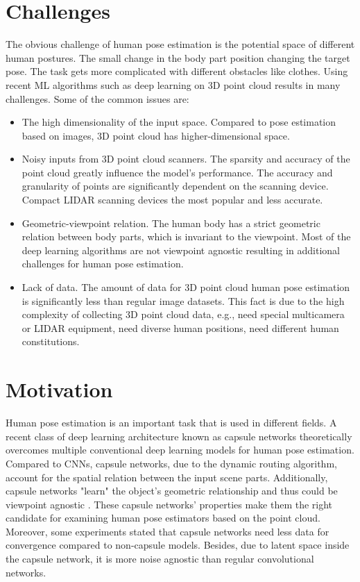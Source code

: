 \section{Challenges}
The obvious challenge of human pose estimation is the potential space of different human postures. The small change in the body part position changing the target pose. The task gets more complicated with different obstacles like clothes.
Using recent ML algorithms such as deep learning on 3D point cloud results in many challenges. Some of the common issues are:
\begin{itemize}
  \item The high dimensionality of the input space. Compared to pose estimation based on images, 3D point cloud has higher-dimensional space.
  \item Noisy inputs from 3D point cloud scanners. The sparsity and accuracy of the point cloud greatly influence the model's performance. The accuracy and granularity of points are significantly dependent on the scanning device. Compact LIDAR scanning devices the most popular and less accurate.
  \item Geometric-viewpoint relation. The human body has a strict geometric relation between body parts, which is invariant to the viewpoint. Most of the deep learning algorithms are not viewpoint agnostic resulting in additional challenges for human pose estimation.
  \item Lack of data. The amount of data for 3D point cloud human pose estimation is significantly less than regular image datasets. This fact is due to the high complexity of collecting 3D point cloud data, e.g., need special multicamera or LIDAR equipment, need diverse human positions, need different human constitutions.
\end{itemize}

\section{Motivation}
Human pose estimation is an important task that is used in different fields.
A recent class of deep learning architecture known as capsule networks \parencite{sabour_dynamic_2017} theoretically overcomes multiple conventional deep learning models for human pose estimation. Compared to CNNs, capsule networks, due to the dynamic routing algorithm, account for the spatial relation between the input scene parts. Additionally, capsule networks "learn" the object's geometric relationship and thus could be viewpoint agnostic \parencite{sabour_dynamic_2017}. These capsule networks' properties make them the right candidate for examining human pose estimators based on the point cloud.
Moreover, some experiments \parencite{wang_capsule_2020,gritsevskiy_capsule_2018} stated that capsule networks need less data for convergence compared to non-capsule models. Besides, due to latent space inside the capsule network, it is more noise agnostic than regular convolutional networks.

